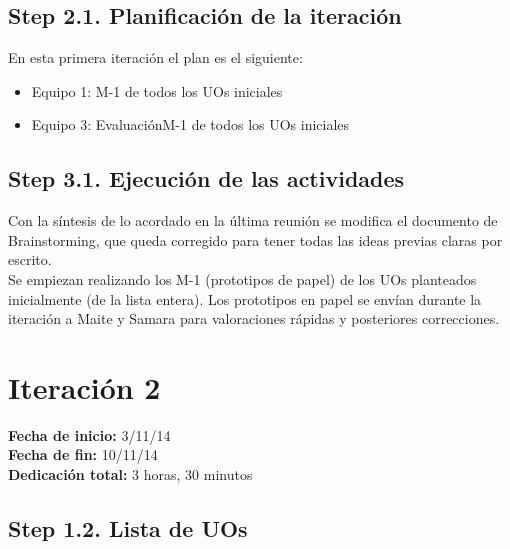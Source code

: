 \subsection{Step 2.1. Planificación de la iteración}
\label{it1:2.1}

En esta primera iteración el plan es el siguiente:

\begin{itemize}
\item Equipo 1: M-1 de todos los UOs iniciales
\item Equipo 3: Evaluación{M-1 de todos los UOs iniciales}
\end{itemize}

\subsection{Step 3.1. Ejecución de las actividades}
\label{it1:3.1}

Con la síntesis de lo acordado en la última reunión se modifica el documento de Brainstorming, que queda corregido para tener todas las ideas previas claras por escrito.\\

Se empiezan realizando los M-1 (prototipos de papel) de los UOs planteados inicialmente (de la lista entera). Los prototipos en papel se envían durante la iteración a Maite y Samara para valoraciones rápidas y posteriores correcciones.\\


\section{Iteración 2}
\label{it2}

\begin{flushleft}
\textbf{Fecha de inicio:} 3/11/14\\
\textbf{Fecha de fin:} 10/11/14\\
\textbf{Dedicación total:} 3 horas, 30 minutos\\
\end{flushleft}

\subsection{Step 1.2. Lista de UOs}
\label{it2:1.2}

